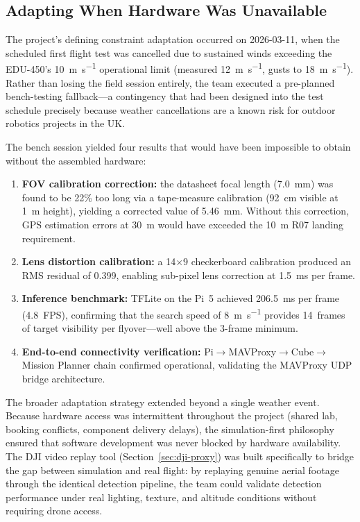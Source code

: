 \subsection{Adapting When Hardware Was Unavailable}\label{sec:adaptation-strategy}

The project's defining constraint adaptation occurred on 2026-03-11, when the scheduled first flight test was cancelled due to sustained winds exceeding the EDU-450's \SI{10}{\metre\per\second} operational limit (measured \SI{12}{\metre\per\second}, gusts to \SI{18}{\metre\per\second}).
Rather than losing the field session entirely, the team executed a pre-planned bench-testing fallback---a contingency that had been designed into the test schedule precisely because weather cancellations are a known risk for outdoor robotics projects in the UK.

The bench session yielded four results that would have been impossible to obtain without the assembled hardware:
\begin{enumerate}[nosep]
  \item \textbf{FOV calibration correction:} the datasheet focal length (\SI{7.0}{\milli\metre}) was found to be 22\% too long via a tape-measure calibration (\SI{92}{\centi\metre} visible at \SI{1}{\metre} height), yielding a corrected value of \SI{5.46}{\milli\metre}. Without this correction, GPS estimation errors at \SI{30}{\metre} would have exceeded the \SI{10}{\metre} R07 landing requirement.
  \item \textbf{Lens distortion calibration:} a 14$\times$9 checkerboard calibration produced an RMS residual of 0.399, enabling sub-pixel lens correction at \SI{1.5}{\milli\second} per frame.
  \item \textbf{Inference benchmark:} TFLite on the Pi~5 achieved \SI{206.5}{\milli\second} per frame (4.8~FPS), confirming that the search speed of \SI{8}{\metre\per\second} provides 14~frames of target visibility per flyover---well above the 3-frame minimum.
  \item \textbf{End-to-end connectivity verification:} Pi$\to$MAVProxy$\to$Cube$\to$Mission Planner chain confirmed operational, validating the MAVProxy UDP bridge architecture.
\end{enumerate}

The broader adaptation strategy extended beyond a single weather event.
Because hardware access was intermittent throughout the project (shared lab, booking conflicts, component delivery delays), the simulation-first philosophy ensured that software development was never blocked by hardware availability.
The DJI video replay tool (Section~\ref{sec:dji-proxy}) was built specifically to bridge the gap between simulation and real flight: by replaying genuine aerial footage through the identical detection pipeline, the team could validate detection performance under real lighting, texture, and altitude conditions without requiring drone access.

